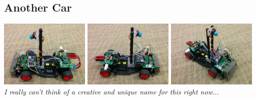 \documentclass{article}
\begin{document}
\subsection{Another Car}
{\centering
\includegraphics[width=0.32\textwidth]{images-dis2-carcritiques/thecar-side1}
\includegraphics[width=0.32\textwidth]{images-dis2-carcritiques/thecar-side2}
\includegraphics[width=0.32\textwidth]{images-dis2-carcritiques/thecar-angle} \\
\textit{I really can't think of a creative and unique name for this right now...} \\}
\end{document}
